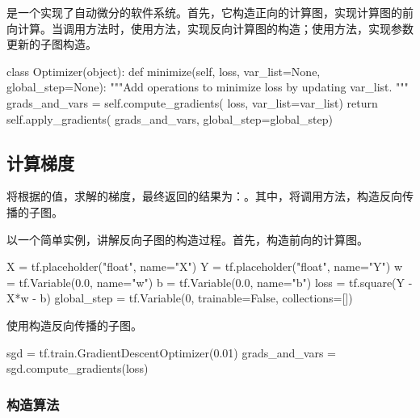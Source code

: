 \begin{content}

\tf{}是一个实现了自动微分的软件系统。首先，它构造正向的计算图，实现计算图的前向计算。当调用方法时，使用方法，实现反向计算图的构造；使用方法，实现参数更新的子图构造。

\begin{leftbar}
\begin{python}
class Optimizer(object):
  def minimize(self, loss, var_list=None, global_step=None):
    """Add operations to minimize loss by updating var_list.
    """
    grads_and_vars = self.compute_gradients(
      loss, var_list=var_list)
    return self.apply_gradients(
      grads_and_vars, 
      global_step=global_step)
\end{python}
\end{leftbar}

\subsection{计算梯度}

将根据的值，求解的梯度，最终返回的结果为：。其中，将调用方法，构造反向传播的子图。

以一个简单实例，讲解反向子图的构造过程。首先，构造前向的计算图。

\begin{leftbar}
\begin{python}
X = tf.placeholder("float", name="X")
Y = tf.placeholder("float", name="Y")
w = tf.Variable(0.0, name="w")
b = tf.Variable(0.0, name="b")
loss = tf.square(Y - X*w - b)
global_step = tf.Variable(0, trainable=False, collections=[])
\end{python}
\end{leftbar}

使用构造反向传播的子图。

\begin{leftbar}
\begin{python}
sgd = tf.train.GradientDescentOptimizer(0.01)
grads_and_vars = sgd.compute_gradients(loss)
\end{python}
\end{leftbar}

\subsubsection{构造算法}


\end{content}
